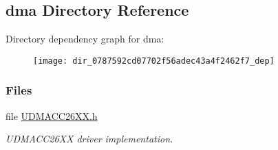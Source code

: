 \subsection{dma Directory Reference}
\label{dir_0787592cd07702f56adec43a4f2462f7}
Directory dependency graph for dma\+:
\nopagebreak
\begin{figure}[H]
\begin{center}
\leavevmode
\texttt{[image: dir\_0787592cd07702f56adec43a4f2462f7\_dep]}
\end{center}
\end{figure}
\subsubsection*{Files}
\begin{DoxyCompactItemize}
\item 
file \hyperlink{_u_d_m_a_c_c26_x_x_8h}{U\+D\+M\+A\+C\+C26\+X\+X.\+h}
\begin{DoxyCompactList}\small\item\em U\+D\+M\+A\+C\+C26\+X\+X driver implementation. \end{DoxyCompactList}\end{DoxyCompactItemize}
